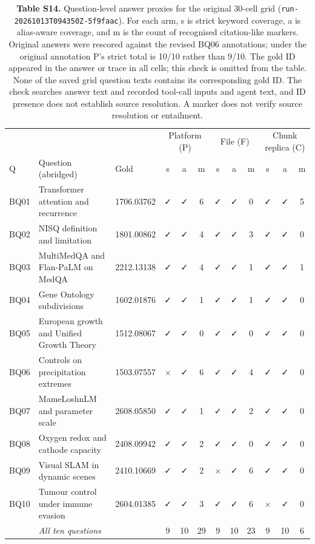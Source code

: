\begin{table}
\centering
\small
\setlength{\tabcolsep}{3pt}
\caption{\textbf{Table S14.} Question-level answer proxies for the original 30-cell grid
(\texttt{run-20261013T094350Z-5f9faac}). For each arm, s is strict
keyword coverage, a is alias-aware coverage, and m is the count of
recognised citation-like markers. Original answers were rescored against the
revised BQ06 annotations; under the original annotation P's strict total is
10/10 rather than 9/10. The gold ID appeared in the answer or
trace in all cells; this check is omitted from the table. None of the saved
grid question texts contains its corresponding gold ID. The check searches
answer text and recorded tool-call inputs and agent text, and ID presence
does not establish source resolution. A marker does not
verify source resolution or entailment.}

\begin{tabular}{@{}lp{4.950cm}l*{9}{c}@{}}
\toprule
 & & & \multicolumn{3}{c}{Platform (P)} & \multicolumn{3}{c}{File (F)} & \multicolumn{3}{c}{Chunk replica (C)}\\

Q & Question (abridged) & Gold & s & a & m & s & a & m & s & a & m\\
\midrule
BQ01 & Transformer attention and recurrence & 1706.03762 & ✓ & ✓ & 6 & ✓ & ✓ & 0 & ✓ & ✓ & 5\\
BQ02 & NISQ definition and limitation & 1801.00862 & ✓ & ✓ & 4 & ✓ & ✓ & 3 & ✓ & ✓ & 0\\
BQ03 & MultiMedQA and Flan-PaLM on MedQA & 2212.13138 & ✓ & ✓ & 4 & ✓ & ✓ & 1 & ✓ & ✓ & 1\\
BQ04 & Gene Ontology subdivisions & 1602.01876 & ✓ & ✓ & 1 & ✓ & ✓ & 1 & ✓ & ✓ & 0\\
BQ05 & European growth and Unified Growth Theory & 1512.08067 & ✓ & ✓ & 0 & ✓ & ✓ & 0 & ✓ & ✓ & 0\\
BQ06 & Controls on precipitation extremes & 1503.07557 & $\times$ & ✓ & 6 & ✓ & ✓ & 4 & ✓ & ✓ & 0\\
BQ07 & MameLoshnLM and parameter scale & 2608.05850 & ✓ & ✓ & 1 & ✓ & ✓ & 2 & ✓ & ✓ & 0\\
BQ08 & Oxygen redox and cathode capacity & 2408.09942 & ✓ & ✓ & 2 & ✓ & ✓ & 0 & ✓ & ✓ & 0\\
BQ09 & Visual SLAM in dynamic scenes & 2410.10669 & ✓ & ✓ & 2 & $\times$ & ✓ & 6 & ✓ & ✓ & 0\\
BQ10 & Tumour control under immune evasion & 2604.01385 & ✓ & ✓ & 3 & ✓ & ✓ & 6 & $\times$ & ✓ & 0\\
\midrule
 & \emph{All ten questions} & & 9 & 10 & 29 & 9 & 10 & 23 & 9 & 10 & 6\\
\bottomrule
\end{tabular}
\end{table}
